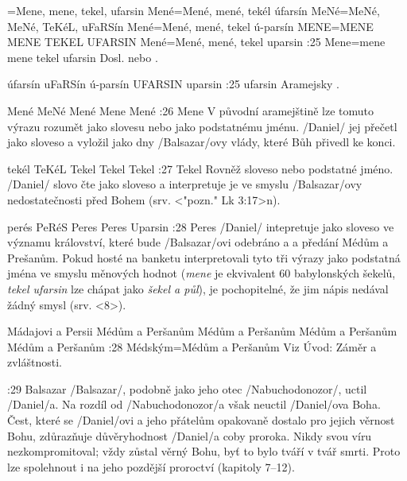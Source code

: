 ={Mene, mene, tekel, ufarsin}   %
    {Mené}={Mené, mené, tekél úfarsín}   %
    {MeNé}={MeNé, MeNé, TeKéL, uFaRSín}   %
    {Mené}={Mené, mené, tekel ú-parsín}   %
    {MENE}={MENE MENE TEKEL UFARSIN}   %
    {Mené}={Mené, mené, tekel uparsin}   %
:25 {Mene}={mene mene tekel ufarsin} Dosl.  nebo . 

    {úfarsín}   %
    {uFaRSín}   %
    {ú-parsín}   %
    {UFARSIN}   %
    {uparsin}   %
:25 {ufarsin} Aramejsky .     


    {Mené}  %
    {MeNé}   %
    {Mené}  %
    {Mene}  %
    {Mené}  %
:26 {Mene} V původní aramejštině lze tomuto výrazu rozumět jako slovesu nebo jako podstatnému jménu. \x/Daniel/ jej přečetl jako sloveso  a vyložil jako dny \x/Balsazar/ovy vlády, které Bůh přivedl ke konci.      

    {tekél}   %
    {TeKéL}   %
    {Tekel}   %
    {Tekel}   %
    {Tekel}   %
:27 {Tekel} Rovněž sloveso nebo podstatné jméno. \x/Daniel/ slovo čte  jako sloveso  a interpretuje je ve smyslu \x/Balsazar/ovy nedostatečnosti před Bohem  (srv. <"pozn." Lk 3:17>n).     
     
    {perés}   %
    {PeRéS}   %
    {Peres}  %
    {Peres}  %
    {Uparsin}   %
:28 {Peres} \x/Daniel/ intepretuje jako sloveso  ve významu království, které bude \x/Balsazar/ovi odebráno a a předání Médům a Prešanům. Pokud hosté na banketu interpretovali tyto tři výrazy jako podstatná jména ve smyslu měnových hodnot ({\it mene\/} je ekvivalent 60 babylonských šekelů, {\it tekel ufarsin\/} lze chápat jako {\it šekel a půl\/}),  je pochopitelné, že jim nápis nedával žádný smysl (srv. <8>).   

    {Mádajovi a Persii}   %
    {Médům a Peršanům}   %
    {Médům a Peršanům}  %
    {Médům a Peršanům}  %
    {Médům a Peršanům}   %
:28 {Médským}={Médům a Peršanům} Viz Úvod: Záměr a zvláštnosti.
     
     
:29 {Balsazar} \x/Balsazar/, podobně jako jeho otec \x/Nabuchodonozor/, uctil \x/Daniel/a. Na rozdíl od \x/Nabuchodonozor/a však neuctil \x/Daniel/ova Boha. Čest, které se \x/Daniel/ovi a jeho přátelům opakovaně dostalo pro jejich věrnost Bohu,  zdůrazňuje důvěryhodnost \x/Daniel/a coby proroka. Nikdy svou víru nezkompromitoval; vždy zůstal věrný Bohu, byť to bylo  tváří v tvář smrti. Proto lze spolehnout i na jeho pozdější proroctví (kapitoly 7--12). 
     
